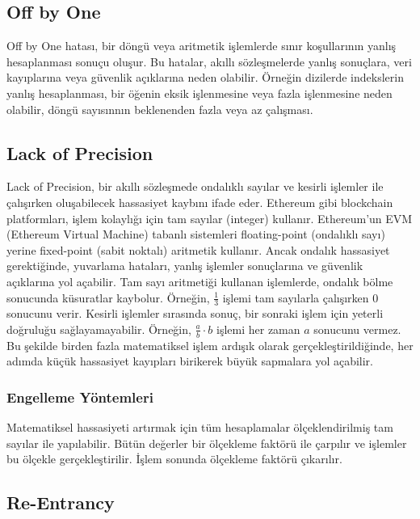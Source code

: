 \newpage

\subsection{Off by One}

Off by One hatası, bir döngü veya aritmetik işlemlerde sınır koşullarının yanlış hesaplanması sonuçu oluşur. Bu hatalar, akıllı sözleşmelerde yanlış sonuçlara, veri kayıplarına veya güvenlik açıklarına neden olabilir. Örneğin dizilerde indekslerin yanlış hesaplanması, bir öğenin eksik işlenmesine veya fazla işlenmesine neden olabilir, döngü sayısınnın beklenenden fazla veya az çalışması.

\newpage

\subsection{Lack of Precision}

Lack of Precision, bir akıllı sözleşmede ondalıklı sayılar ve kesirli işlemler ile çalışırken oluşabilecek hassasiyet kaybını ifade eder. Ethereum gibi blockchain platformları, işlem kolaylığı için tam sayılar (integer) kullanır. Ethereum'un EVM (Ethereum Virtual Machine) tabanlı sistemleri floating-point (ondalıklı sayı) yerine fixed-point (sabit noktalı) aritmetik kullanır. Ancak ondalık hassasiyet gerektiğinde, yuvarlama hataları, yanlış işlemler sonuçlarına ve güvenlik açıklarına yol açabilir. Tam sayı aritmetiği kullanan işlemlerde, ondalık bölme sonucunda küsuratlar kaybolur. Örneğin, $\frac{1}{3}$ işlemi tam sayılarla çalışırken 0 sonucunu verir. Kesirli işlemler sırasında sonuç, bir sonraki işlem için yeterli doğruluğu sağlayamayabilir. Örneğin, $\frac{a}{b} \cdot b$ işlemi her zaman $a$ sonucunu vermez. Bu şekilde birden fazla matematiksel işlem ardışık olarak gerçekleştirildiğinde, her adımda küçük hassasiyet kayıpları birikerek büyük sapmalara yol açabilir.

\subsubsection{Engelleme Yöntemleri}

Matematiksel hassasiyeti artırmak için tüm hesaplamalar ölçeklendirilmiş tam sayılar ile yapılabilir. Bütün değerler bir ölçekleme faktörü ile çarpılır ve işlemler bu ölçekle gerçekleştirilir. İşlem sonunda ölçekleme faktörü çıkarılır.

\newpage

\subsection{Re-Entrancy}

